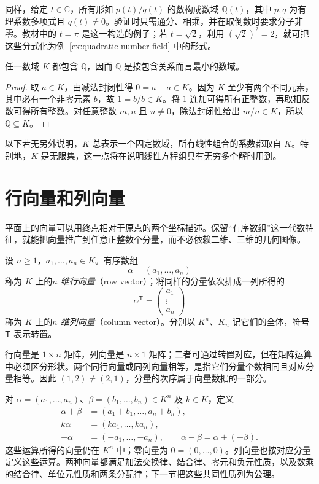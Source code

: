 同样，给定 $t\in\mathbb C$，所有形如 $p(t)/q(t)$ 的数构成数域 $\mathbb Q(t)$，其中 $p,q$ 为有理系数多项式且 $q(t)\ne0$。验证时只需通分、相乘，并在取倒数时要求分子非零。教材中的 $t=\pi$ 是这一构造的例子；若 $t=\sqrt2$，利用 $(\sqrt2)^2=2$，就可把这些分式化为例~\ref{ex:quadratic-number-field} 中的形式。

\begin{theorem}
\label{thm:number-field-contains-rationals}
任一数域 $K$ 都包含 $\mathbb Q$，因而 $\mathbb Q$ 是按包含关系而言最小的数域。
\end{theorem}

\begin{proof}
取 $a\in K$，由减法封闭性得 $0=a-a\in K$。因为 $K$ 至少有两个不同元素，其中必有一个非零元素 $b$，故 $1=b/b\in K$。将 $1$ 连加可得所有正整数，再取相反数可得所有整数。对任意整数 $m,n$ 且 $n\ne0$，除法封闭性给出 $m/n\in K$，所以 $\mathbb Q\subseteq K$。
\end{proof}

以下若无另外说明，$K$ 总表示一个固定数域，所有线性组合的系数都取自 $K$。特别地，$K$ 是无限集，这一点将在说明线性方程组具有无穷多个解时用到。

\section{行向量和列向量}
\label{sec:row-column-vectors}

平面上的向量可以用终点相对于原点的两个坐标描述。保留“有序数组”这一代数特征，就能把向量推广到任意正整数个分量，而不必依赖二维、三维的几何图像。

\begin{definition}
\label{def:row-column-vector}
设 $n\geq1$，$a_1,\ldots,a_n\in K$。有序数组
\[
    \alpha=(a_1,\ldots,a_n)
\]
称为 $K$ 上的\emph{$n$ 维行向量}（row vector）；将同样的分量依次排成一列所得的
\[
    \alpha^{\mathsf T}=\begin{pmatrix}a_1\\\vdots\\a_n\end{pmatrix}
\]
称为 $K$ 上的\emph{$n$ 维列向量}（column vector）。分别以 $K^n$、$K_n$ 记它们的全体，符号 $\mathsf T$ 表示转置。
\end{definition}

行向量是 $1\times n$ 矩阵，列向量是 $n\times1$ 矩阵；二者可通过转置对应，但在矩阵运算中必须区分形状。两个同行向量或同列向量相等，是指它们分量个数相同且对应分量相等。因此 $(1,2)\ne(2,1)$，分量的次序属于向量数据的一部分。

对 $\alpha=(a_1,\ldots,a_n)$、$\beta=(b_1,\ldots,b_n)\in K^n$ 及 $k\in K$，定义
\begin{align*}
    \alpha+\beta&=(a_1+b_1,\ldots,a_n+b_n),\\
    k\alpha&=(ka_1,\ldots,ka_n),\\
    -\alpha&=(-a_1,\ldots,-a_n),\qquad
    \alpha-\beta=\alpha+(-\beta).
\end{align*}
这些运算所得的向量仍在 $K^n$ 中；零向量为 $0=(0,\ldots,0)$。列向量也按对应分量定义这些运算。两种向量都满足加法交换律、结合律、零元和负元性质，以及数乘的结合律、单位元性质和两条分配律；下一节把这些共同性质列为公理。

